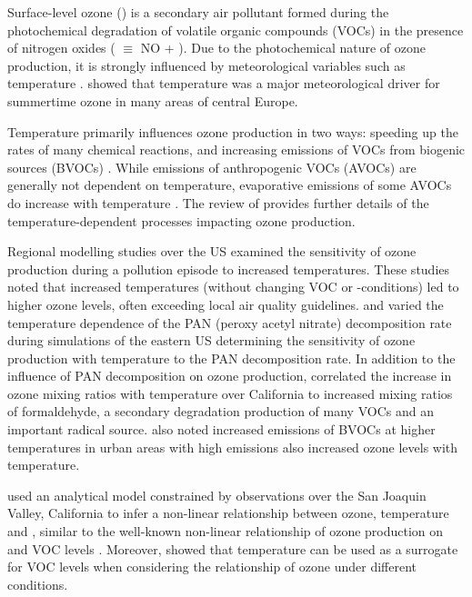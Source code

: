 Surface-level ozone () is a secondary air pollutant formed during the photochemical degradation of volatile organic compounds (VOCs) in the presence of nitrogen oxides ( $\equiv$ NO + ).
Due to the photochemical nature of ozone production, it is strongly influenced by meteorological variables such as temperature \citep{Jacob:2009}.
\citet{Otero:2016} showed that temperature was a major meteorological driver for summertime ozone in many areas of central Europe.

Temperature primarily influences ozone production in two ways: speeding up the rates of many chemical reactions, and increasing emissions of VOCs from biogenic sources (BVOCs) \citep{Sillman:1995a}.
While emissions of anthropogenic VOCs (AVOCs) are generally not dependent on temperature, evaporative emissions of some AVOCs do increase with temperature \citep{Rubin:2006}.
The review of \citet{Pusede:2015} provides further details of the temperature-dependent processes impacting ozone production.

Regional modelling studies over the US \citep{Sillman:1995a, Steiner:2006, Dawson:2007} examined the sensitivity of ozone production during a pollution episode to increased temperatures.
These studies noted that increased temperatures (without changing VOC or -conditions) led to higher ozone levels, often exceeding local air quality guidelines.
\citet{Sillman:1995a} and \citet{Dawson:2007} varied the temperature dependence of the PAN (peroxy acetyl nitrate) decomposition rate during simulations of the eastern US determining the sensitivity of ozone production with temperature to the PAN decomposition rate.
In addition to the influence of PAN decomposition on ozone production, \citet{Steiner:2006} correlated the increase in ozone mixing ratios with temperature over California to increased mixing ratios of formaldehyde, a secondary degradation production of many VOCs and an important radical source.
\citet{Steiner:2006} also noted increased emissions of BVOCs at higher temperatures in urban areas with high  emissions also increased ozone levels with temperature.

\citet{Pusede:2014} used an analytical model constrained by observations over the San Joaquin Valley, California to infer a non-linear relationship between ozone, temperature and , similar to the well-known non-linear relationship of ozone production on  and VOC levels \citep{Sillman:1999}.
Moreover, \citet{Pusede:2014} showed that temperature can be used as a surrogate for VOC levels when considering the relationship of ozone under different  conditions.

